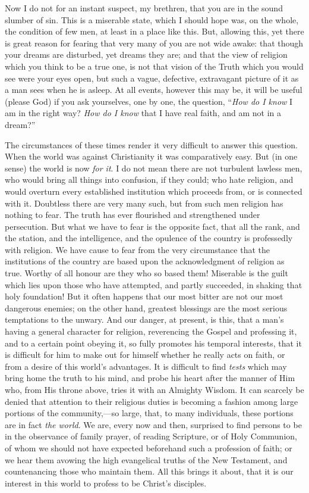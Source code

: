 Now I do not for an instant suspect, my brethren, that
you are in the sound slumber of sin. This is a miserable
state, which I should hope was, on the whole, the
condition of few men, at least in a place like this. But,
allowing this, yet there is great reason for fearing that
very many of you are not wide awake: that though your
dreams are disturbed, yet dreams they are; and that the
view of religion which you think to be a true one, is not
that vision of the Truth which you would see were your
eyes open, but such a vague, defective, extravagant
picture of it as a man sees when he is asleep. At all
events, however this may be, it will be useful (please
God) if you ask yourselves, one by one, the question,
``\emph{How do I know} I am in the right way? \emph{How
do I know} that I have real faith, and am not in a
dream?''

The circumstances of these times render it very
difficult to answer this question. When the world was
against Christianity it was comparatively easy. But (in
one sense) the world is now \emph{for it}. I do not
mean there are not turbulent lawless men, who would bring
all things into confusion, if they could; who hate
religion, and would overturn every established
institution which proceeds from, or is connected with it.
Doubtless there are very many such, but from such men
religion has nothing to fear. The truth has ever
flourished and strengthened under persecution. But what
we have to fear is the opposite fact, that all the rank,
and the station, and the intelligence, and the opulence
of the country is professedly with religion. We have
cause to fear from the very circumstance that the
institutions of the country are based upon the
acknowledgment of religion as true. Worthy of all honour
are they who so based them! Miserable is the guilt which
lies upon those who have attempted, and partly succeeded,
in shaking that holy foundation! But it often happens
that our most bitter are not our most dangerous enemies;
on the other hand, greatest blessings are the most
serious temptations to the unwary. And our danger, at
present, is this, that a man's having a general character
for religion, reverencing the Gospel and professing it,
and to a certain point obeying it, so fully promotes his
temporal interests, that it is difficult for him to make
out for himself whether he really acts on faith, or from
a desire of this world's advantages. It is difficult to
find \emph{tests} which may bring home the truth to his
mind, and probe his heart after the manner of Him who,
from His throne above, tries it with an Almighty Wisdom.
It can scarcely be denied that attention to their
religious duties is becoming a fashion among large
portions of the community,—so large, that, to many
individuals, these portions are in fact \emph{the world}.
We are, every now and then, surprised to find persons to
be in the observance of family prayer, of reading
Scripture, or of Holy Communion, of whom we should not
have expected beforehand such a profession of faith; or
we hear them avowing the high evangelical truths of the
New Testament, and countenancing those who maintain them.
All this brings it about, that it is our interest in this
world to profess to be Christ's disciples.

